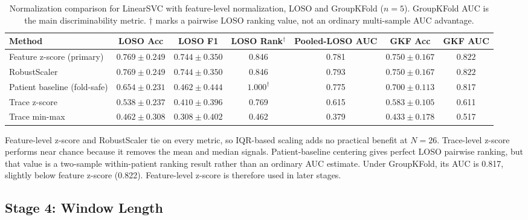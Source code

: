 \documentclass[acmtog]{acmart}
\begin{document}
\begin{table}[t]
  \caption{Normalization comparison for LinearSVC with feature-level normalization,
           LOSO and GroupKFold ($n{=}5$). GroupKFold AUC is the main
           discriminability metric. $\dagger$ marks a pairwise LOSO ranking value,
           not an ordinary multi-sample AUC advantage.}
  \label{tab:normalization}
  \centering\small
  \begin{tabular}{lcccccc}
    \toprule
    Method
      & LOSO Acc
      & LOSO F1
      & LOSO Rank$^\dagger$
      & Pooled-LOSO AUC
      & GKF Acc
      & \textbf{GKF AUC} \\
    \midrule
    Feature z-score (primary)
      & $0.769 \pm 0.249$
      & $0.744 \pm 0.350$
      & 0.846
      & 0.781
      & $0.750 \pm 0.167$
      & $\mathbf{0.822}$ \\
    RobustScaler
      & $0.769 \pm 0.249$
      & $0.744 \pm 0.350$
      & 0.846
      & 0.793
      & $0.750 \pm 0.167$
      & $\mathbf{0.822}$ \\
    Patient baseline (fold-safe)
      & $0.654 \pm 0.231$
      & $0.462 \pm 0.444$
      & $1.000^\dagger$
      & 0.775
      & $0.700 \pm 0.113$
      & 0.817 \\
    Trace z-score
      & $0.538 \pm 0.237$
      & $0.410 \pm 0.396$
      & 0.769
      & 0.615
      & $0.583 \pm 0.105$
      & 0.611 \\
    Trace min-max
      & $0.462 \pm 0.308$
      & $0.308 \pm 0.402$
      & 0.462
      & 0.379
      & $0.433 \pm 0.178$
      & 0.517 \\
    \bottomrule
  \end{tabular}
\end{table}

Feature-level z-score and RobustScaler tie on every metric, so IQR-based scaling
adds no practical benefit at $N{=}26$. Trace-level z-score performs near chance
because it removes the mean and median signals. Patient-baseline centering gives
perfect LOSO pairwise ranking, but that value is a two-sample within-patient
ranking result rather than an ordinary AUC estimate. Under GroupKFold, its AUC
is 0.817, slightly below feature z-score (0.822). Feature-level z-score is
therefore used in later stages.

\subsection{Stage 4: Window Length}\label{sec:stage4_results}
\end{document}
